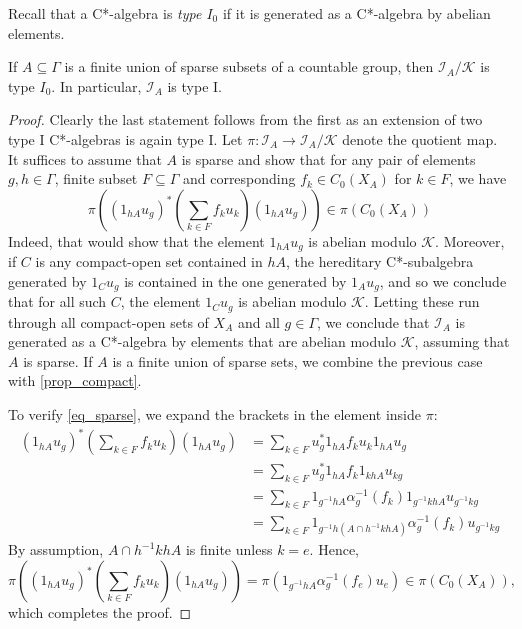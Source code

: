 \documentclass[12pt, a4paper, oneside]{amsart}
\newcommand{\0}{\mathbf{0}}
\newcommand{\1}{\mathbf{1}}
\newcommand{\I}{\mathscr{I}}
\newcommand{\K}{\mathscr{K}}
\begin{document}
	Recall that a C*-algebra is \textit{type \(I_0\)} if it is generated as a C*-algebra by abelian elements. 
	
	\begin{proposition}
		If \(A \subseteq \Gamma\) is a finite union of sparse subsets of a countable group, then \(\I_A/ \K\) is type \(I_0\). In particular, \(\I_A\) is type I. 
	\end{proposition}
	
	\begin{proof} 
		Clearly the last statement follows from the first as an extension of two type I C*-algebras is again type I. Let \(\pi \colon \I_A \to \I_A/\K\) denote the quotient map. It suffices to assume that \(A\) is sparse and show that for any pair of elements \(g,h \in \Gamma\), finite subset \(F \subseteq \Gamma\) and corresponding \(f_k \in C_0(X_A)\) for \(k \in F\), we have 
		\begin{equation}
			\label{eq_sparse}
		\pi \left( (1_{hA}u_g)^* \left( \sum_{k \in F} f_k u_k \right) (1_{hA}u_g) \right) \in \pi(C_0(X_A))
		\end{equation}
		Indeed, that would show that the element \(1_{hA}u_g\) is abelian modulo \(\K\). Moreover, if \(C\) is any compact-open set contained in \(hA\), the hereditary C*-subalgebra generated by \(1_Cu_g\) is contained in the one generated by \(1_A u_g\), and so we conclude that for all such \(C\), the element \(1_Cu_g\) is abelian modulo \(\K\). Letting these run through all compact-open sets of \(X_A\) and all \(g \in \Gamma\), we conclude that \(\I_A\) is generated as a C*-algebra by elements that are abelian modulo \(\K\), assuming that \(A\) is sparse. If \(A\) is a finite union of sparse sets, we combine the previous case with \cref{prop_compact}.
		
		To verify \cref{eq_sparse}, we expand the brackets in the element inside \(\pi\): 
		\begin{align*}
			(1_{hA}u_g)^* \left( \sum_{k \in F} f_k u_k \right) (1_{hA}u_g) &= \sum_{k \in F} u_g^* 1_{hA} f_k u_k 1_{hA} u_g \\
			&= \sum_{k \in F} u_g^* 1_{hA} f_k 1_{khA} u_{kg} \\
			&= \sum_{k \in F} 1_{g^{-1} hA} \alpha_g^{-1}(f_k) 1_{g^{-1}khA} u_{g^{-1}k g} \\
			&= \sum_{k \in F} 1_{g^{-1}h(A \cap h^{-1}khA)} \alpha_g^{-1}(f_k) u_{g^{-1}kg}
		\end{align*}
		By assumption, \(A \cap h^{-1}khA\) is finite unless \(k = e\). Hence, 
		\[	\pi \left( (1_{hA}u_g)^* \left( \sum_{k \in F} f_k u_k \right) (1_{hA}u_g) \right) = \pi(1_{g^{-1}hA} \alpha_g^{-1}(f_e) u_e) \in \pi(C_0(X_A)),\]
		which completes the proof. 
	\end{proof}
	
\end{document}
